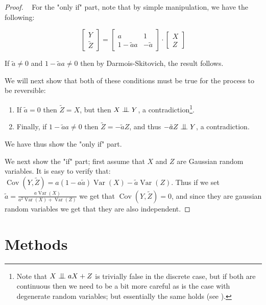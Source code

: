 \begin{proof} 
    ~
For the "only if" part, note that by simple manipulation, we have the following:

\[
    \begin{bmatrix}
        Y \\
        \tilde{Z}
    \end{bmatrix}
    =
    \begin{bmatrix}
    a & 1 \\
    1 - \tilde{a}a & -\tilde{a}
    \end{bmatrix}
    \cdot
    \begin{bmatrix}
        X \\
        Z
    \end{bmatrix}
\]

If $\tilde{a} \neq 0$ and $1 - \tilde{a}a \neq 0$ then by Darmois-Skitovich, the result follows.

We will next show that both of these conditions must be true for the process to be reversible:

\begin{enumerate}
    \item If $\tilde{a} = 0$ then $\tilde{Z} = X$, but then $X \bigCI Y$, a contradiction\footnote{
        Note that $X \bigCI aX + Z$ is trivially false 
        in the discrete case, but if both are continuous then we need to be a bit more careful as is the 
        case with degenerate random variables; but essentially the same holds (see \cite{Peters2008diploma}).
    }.
    \item Finally, if $1 - \tilde{a}a \neq 0$ then $\tilde{Z} = -\tilde{a}Z$, and thus 
    $-\tilde{a}Z \bigCI Y$, a contradiction.
\end{enumerate}

We have thus show the "only if" part. 

We next show the "if" part; first assume that $X$ and $Z$ are Gaussian random variables. 
It is easy to verify that:
$\operatorname{Cov}(Y, \tilde{Z}) = a(1 - a\tilde{a})\operatorname{Var}(X) - \tilde{a}\operatorname{Var}(Z)$.
Thus if we set $\tilde{a} = \frac{a \operatorname{Var}(X)}{a^2 \operatorname{Var}(X) + \operatorname{Var}(Z)}$ 
we get that $\operatorname{Cov}(Y, \tilde{Z}) = 0$, and since they are gaussian random variables we get 
that they are also independent.


\end{proof}


\section{Methods}

